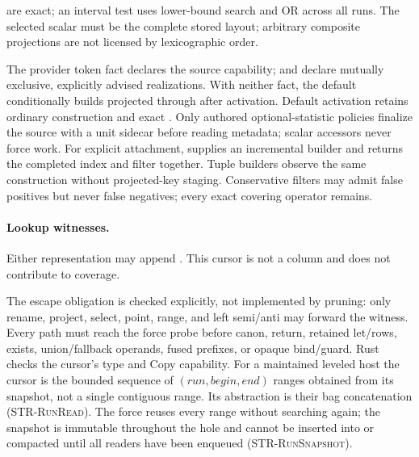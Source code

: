 are exact; an interval test uses lower-bound search and OR across all runs.
The selected scalar must be the complete stored layout; arbitrary composite
projections are not licensed by lexicographic order.
\begin{mathpar}
\end{mathpar}
The provider token fact  declares the source capability;
 and  declare mutually exclusive,
explicitly advised realizations. With neither fact, the default conditionally
builds projected  through  after activation.
Default activation retains ordinary construction and exact
. Only authored optional-statistic policies finalize the
source with a unit sidecar before reading metadata; scalar accessors never force work.
For explicit attachment,  supplies an incremental builder
and  returns the completed index and filter together.
Tuple builders observe the same construction without projected-key staging.
Conservative filters may admit false positives but never false negatives;
every exact covering operator remains.

\paragraph{Lookup witnesses.}
Either representation may append .
This cursor is not a column and does not contribute to coverage.
\begin{mathpar}
\end{mathpar}
The escape obligation is checked explicitly, not implemented by pruning:
only rename, project, select, point, range, and left semi/anti may forward
the witness. Every path must reach the force probe before canon, return,
retained let/rows, exists, union/fallback operands, fused prefixes, or opaque
bind/guard. Rust checks the cursor's type and Copy capability.
For a maintained leveled host the cursor is the bounded sequence of
$(\mathit{run},\mathit{begin},\mathit{end})$ ranges obtained from its snapshot,
not a single contiguous range. Its abstraction is their bag concatenation
(\textsc{STR-RunRead}). The force reuses every range without searching again;
the snapshot is immutable throughout the hole and cannot be inserted into or
compacted until all readers have been enqueued (\textsc{STR-RunSnapshot}).

